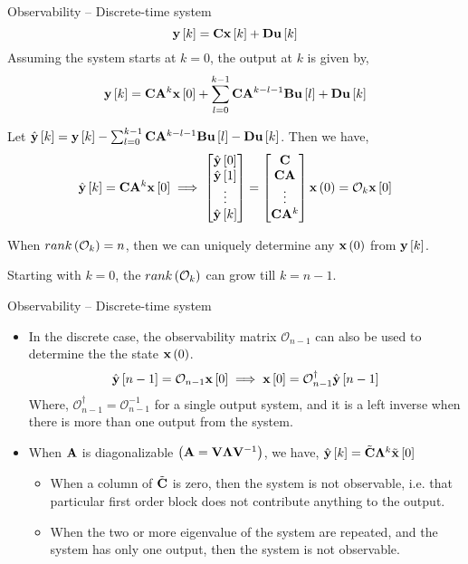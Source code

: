 \documentclass[aspectratio=169]{beamer}
\def\mf{\ensuremath\mathbf}
\def\lp{\ensuremath\left(}
\def\rp{\ensuremath\right)}
\def\ls{\ensuremath\left[}
\def\rs{\ensuremath\right]}
\def\emx{\ensuremath\end{bmatrix*}}
\def\bmxc{\ensuremath\begin{bmatrix*}[c]}
\newcommand{\ct}[1]{\lp #1\rp}
\newcommand{\dt}[1]{\ls #1\rs}
\begin{document}
\begin{frame}{Observability -- Discrete-time system}
\vspace{-0.2cm}
\[ \mf{y}\dt{k} = \mf{C}\mf{x}\dt{k} + \mf{D}\mf{u}\dt{k} \]
Assuming the system starts at $k=0$, the output at $k$ is given by,\vspace{-0.15cm}
\[ \mf{y}\dt{k} = \mf{C}\mf{A}^{k}\mf{x}\dt{0} + \sum_{l=0}^{k-1} \mf{C}\mf{A}^{k-l-1}\mf{B}\mf{u}\dt{l} + \mf{D}\mf{u}\dt{k} \]\vspace{-0.15cm}

Let $\hat{\mf{y}}\dt{k} = \mf{y}\dt{k} - \sum_{l=0}^{k-1} \mf{C}\mf{A}^{k-l-1}\mf{B}\mf{u}\dt{l} - \mf{D}\mf{u}\dt{k}$. Then we have,\vspace{-0.15cm}
\[ \hat{\mf{y}}\dt{k} = \mf{C}\mf{A}^k\mf{x}\dt{0} \implies \bmxc \hat{\mf{y}}\dt{0}\\ \hat{\mf{y}}\dt{1}\\ \vdots \\\hat{\mf{y}}\dt{k} \emx = \bmxc \mf{C} \\ \mf{C}\mf{A} \\ \vdots \\ \mf{C}\mf{A}^{k} \emx \mf{x}\ct{0} = \mathcal{O}_k\mf{x}\dt{0}\]

When $rank\ct{\mathcal{O}_k} = n$, then we can uniquely determine any $\mf{x}\ct{0}$ from $\mf{y}\dt{k}$. 

Starting with $k=0$, the $rank\ct{\mathcal{O}_k}$ can grow till $k = n-1$.
\end{frame}

 
\begin{frame}{Observability -- Discrete-time system}
\begin{itemize}
    \item In the discrete case, the observability matrix $\mathcal{O}_{n-1}$ can also be used to determine the the state $\mf{x}\ct{0}$.
    \[ \hat{\mf{y}}\dt{n-1} = \mathcal{O}_{n-1}\mf{x}\dt{0} \implies \mf{x}\dt{0} = \mathcal{O}_{n-1}^\dagger\hat{\mf{y}}\dt{n-1} \]
    Where, $\mathcal{O}_{n-1}^\dagger = \mathcal{O}_{n-1}^{-1}$ for a single output system, and it is a left inverse when there is more than one output from the system.

    \item When $\mf{A}$ is diagonalizable $\ct{\mf{A} = \mf{V}\mf{\Lambda}\mf{V}^{-1}}$, we have, $\hat{\mf{y}}\dt{k} = \tilde{\mf{C}}\mf{\Lambda}^k\tilde{\mf{x}}\dt{0}$

    \begin{itemize}
        \item When a column of $\tilde{\mf{C}}$ is zero, then the system is not observable, i.e. that particular first order block does not contribute anything to the output.\vspace{0.2cm}

        \item When the two or more eigenvalue of the system are repeated, and the system has only one output, then the system is not observable.
    \end{itemize}
\end{itemize}
\end{frame}
\end{document}
